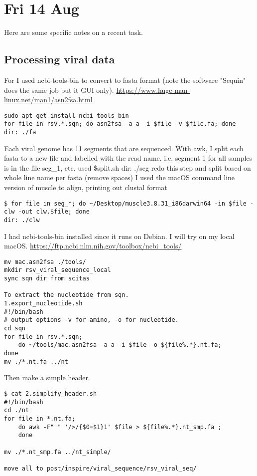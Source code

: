 \section{Fri 14 Aug \projectB{} }
Here are some specific notes on a recent task.

\subsection{Processing viral data}
For \projectB{} I used ncbi-tools-bin to convert to fasta format
(note the software "Sequin" does the same job but it GUI only).
\url{https://www.huge-man-linux.net/man1/asn2fsa.html}
\begin{lstlisting}
sudo apt-get install ncbi-tools-bin
for file in rsv.*.sqn; do asn2fsa -a a -i $file -v $file.fa; done
dir: ./fa
\end{lstlisting}

Each viral genome has 11 segments that are sequenced.
With awk, I split each fasta to a new file and labelled with the read name.
i.e. segment 1 for all samples is in the file seg\_1, etc.
used \$split.sh
dir: ./seg
redo this step and split based on whole line name per fasta (remove spaces)
I used the macOS command line version of muscle to align, printing out clustal format
\begin{lstlisting}
$ for file in seg_*; do ~/Desktop/muscle3.8.31_i86darwin64 -in $file -clw -out clw.$file; done
dir: ./clw
\end{lstlisting}

I had ncbi-tools-bin installed since it runs on Debian.
I will try on my local macOS.
\url{https://ftp.ncbi.nlm.nih.gov/toolbox/ncbi_tools/}
\begin{lstlisting}
mv mac.asn2fsa ./tools/
mkdir rsv_viral_sequence_local
sync sqn dir from scitas

To extract the nucleotide from sqn.
1.export_nucleotide.sh
#!/bin/bash
# output options -v for amino, -o for nucleotide.
cd sqn
for file in rsv.*.sqn;
    do ~/tools/mac.asn2fsa -a a -i $file -o ${file%.*}.nt.fa;
done
mv ./*.nt.fa ../nt
\end{lstlisting}

Then make a simple header.
\begin{lstlisting}
$ cat 2.simplify_header.sh
#!/bin/bash
cd ./nt
for file in *.nt.fa;
    do awk -F" " '/>/{$0=$1}1' $file > ${file%.*}.nt_smp.fa ;
    done

mv ./*.nt_smp.fa ../nt_simple/

move all to post/inspire/viral_sequence/rsv_viral_seq/
\end{lstlisting}

